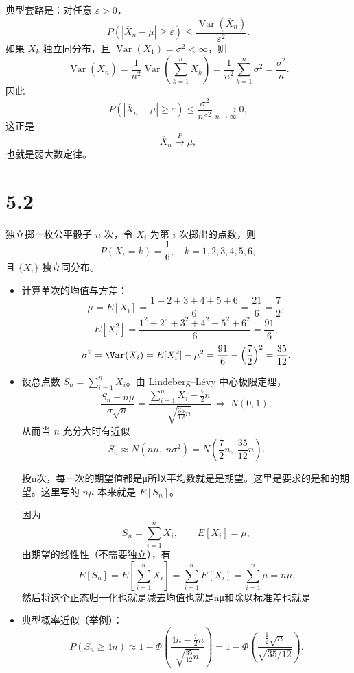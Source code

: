 典型套路是：对任意 $\varepsilon>0$，
\[
P\!\left(\left|\overline X_n-\mu\right|\ge \varepsilon\right)
\le \frac{\operatorname{Var}(\overline X_n)}{\varepsilon^2}.
\]
如果 $X_k$ 独立同分布，且 $\operatorname{Var}(X_1)=\sigma^2<\infty$，则
\[
\operatorname{Var}(\overline X_n)
=\frac{1}{n^2}\operatorname{Var}\!\left(\sum_{k=1}^n X_k\right)
=\frac{1}{n^2}\sum_{k=1}^n \sigma^2
=\frac{\sigma^2}{n}.
\]
因此
\[
P\!\left(\left|\overline X_n-\mu\right|\ge \varepsilon\right)
\le \frac{\sigma^2}{n\varepsilon^2}
\xrightarrow[n\to\infty]{}0,
\]
这正是
\[
\overline X_n\xrightarrow{P}\mu,
\]
也就是弱大数定律。
\section{5.2}
\begin{example}
独立掷一枚公平骰子 $n$ 次，令 $X_i$ 为第 $i$ 次掷出的点数，则
\[
P(X_i=k)=\frac16,\quad k=1,2,3,4,5,6,
\]
且 $\{X_i\}$ 独立同分布。

\begin{itemize}
  \item 计算单次的均值与方差：
  \[
  \mu=E[X_i]=\frac{1+2+3+4+5+6}{6}=\frac{21}{6}=\frac{7}{2},
  \]
  \[
  E[X_i^2]=\frac{1^2+2^2+3^2+4^2+5^2+6^2}{6}=\frac{91}{6},
  \]
  \[
  \sigma^2=\Var(X_i)=E[X_i^2]-\mu^2=\frac{91}{6}-\Big(\frac{7}{2}\Big)^2=\frac{35}{12}.
  \]

  \item 设总点数 $S_n=\sum_{i=1}^n X_i$。由 Lindeberg--L\'evy 中心极限定理，
  \[
  \frac{S_n-n\mu}{\sigma\sqrt{n}}
  =
  \frac{\sum_{i=1}^n X_i-\frac{7}{2}n}{\sqrt{\frac{35}{12}n}}
  \ \Rightarrow\ N(0,1),
  \]
  从而当 $n$ 充分大时有近似
  \[
  S_n \approx N\!\left(n\mu,\;n\sigma^2\right)
  =
  N\!\left(\frac{7}{2}n,\;\frac{35}{12}n\right).
  \]
\begin{dxtips}
    投n次，每一次的期望值都是μ所以平均数就是是期望。这里是要求的是和的期望。这里写的 $n\mu$ 本来就是 $E[S_n]$。

因为
\[
S_n=\sum_{i=1}^n X_i,\qquad E[X_i]=\mu,
\]
由期望的线性性（不需要独立），有
\[
E[S_n]
=E\!\left[\sum_{i=1}^n X_i\right]
=\sum_{i=1}^n E[X_i]
=\sum_{i=1}^n \mu
=n\mu.
\]
然后将这个正态归一化也就是减去均值也就是nμ和除以标准差也就是
\end{dxtips}
  \item 典型概率近似（举例）：
  \[
  P(S_n\ge 4n)\approx
  1-\Phi\!\left(\frac{4n-\frac{7}{2}n}{\sqrt{\frac{35}{12}n}}\right)
  =
  1-\Phi\!\left(\frac{\frac12\sqrt{n}}{\sqrt{35/12}}\right).
  \]
\end{itemize}
\end{example}
